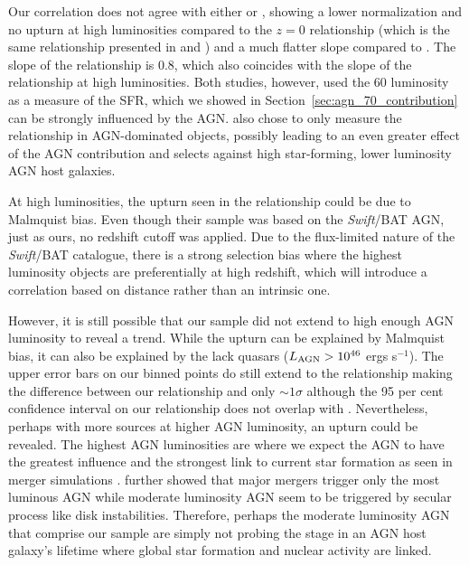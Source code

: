 \documentclass[fleqn, usenatbib]{mnras}
\newcommand{\swift}{\textit{Swift}}
\begin{document}
Our correlation does not agree with either \citet{Rosario:2012fr} or \citet{Netzer:2009lr}, showing a lower normalization and no upturn at high luminosities compared to the \citet{Rosario:2012fr} $z=0$ relationship (which is the same relationship presented in \citet{Lutz:2010kx} and  \citet{Shao:2010fp}) and a much flatter slope compared to \citet{Netzer:2009lr}. The slope of the \citet{Netzer:2009lr} relationship is 0.8, which also coincides with the slope of the \citet{Rosario:2012fr} relationship at high luminosities. Both studies, however, used the 60 \micron{} luminosity as a measure of the SFR, which we showed in Section~\ref{sec:agn_70_contribution} can be strongly influenced by the AGN. \citet{Netzer:2009lr} also chose to only measure the relationship in AGN-dominated objects, possibly leading to an even greater effect of the AGN contribution and selects against high star-forming, lower luminosity AGN host galaxies.

At high luminosities, the upturn seen in the \citet{Rosario:2012fr} relationship could be due to Malmquist bias. Even though their sample was based on the \swift/BAT AGN, just as ours, no redshift cutoff was applied. Due to the flux-limited nature of the \swift/BAT catalogue, there is a strong selection bias where the highest luminosity objects are preferentially at high redshift, which will introduce a correlation based on distance rather than an intrinsic one.  %

However, it is still possible that our sample did not extend to high enough AGN luminosity to reveal a trend. While the upturn can be explained by Malmquist bias, it can also be explained by the lack quasars ($L_{\rm AGN} > 10^{46}$ ergs s$^{-1}$). The upper error bars on our binned points do still extend to the \citet{Rosario:2012fr} relationship making the difference between our relationship and \citet{Rosario:2012fr} only $\sim1\sigma$ although the 95 per cent confidence interval on our relationship does not overlap with \citet{Rosario:2012fr}. Nevertheless, perhaps with more sources at higher AGN luminosity, an upturn could be revealed. The highest AGN luminosities are where we expect the AGN to have the greatest influence and the strongest link to current star formation as seen in merger simulations \citep[e.g.][]{Di-Matteo:2005lr}. \citet{Treister:2012rt} further showed that major mergers trigger only the most luminous AGN while moderate luminosity AGN seem to be triggered by secular process like disk instabilities. Therefore, perhaps the moderate luminosity AGN that comprise our sample are simply not probing the stage in an AGN host galaxy's lifetime where global star formation and nuclear activity are linked. 
\end{document}
